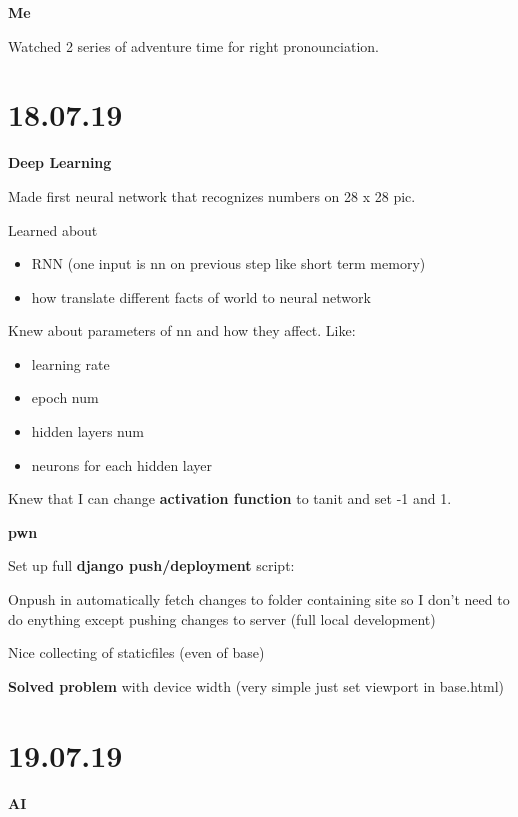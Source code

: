 \documentclass[12pt,a4paper,titlepage]{article}
\begin{document}
\begin{center}
    \large \textbf{Me}
\end{center}
Watched 2 series of adventure time for right pronounciation.

\newpage
\section{18.07.19}
\begin{center}
    \large \textbf{Deep Learning}
\end{center}

Made first neural network that recognizes numbers on 28 x 28 pic.

Learned about 
\begin{itemize}
    \item RNN (one input is nn on previous step like short term me\-mory)
    \item how translate different facts of world to neural network
\end{itemize} 

Knew about parameters of nn and how they affect. Like:
\begin{itemize}
    \item learning rate
    \item epoch num
    \item hidden layers num
    \item neurons for each hidden layer
\end{itemize}

Knew that I can change \textbf{activation function} to tanit and set -1 and 1.

\begin{center}
    \large \textbf{pwn}
\end{center}

Set up full \textbf{django push/deployment} script:

Onpush in automatically fetch changes to folder con\-ta\-ining si\-te so I don't ne\-ed to do enything except pushing changes to server (full local deve\-lop\-ment)

Nice collecting of staticfiles (even of base)

\textbf{Solved problem} with device width (very simple just set view\-port in base.html)

\newpage
\section{19.07.19}
\begin{center}
    \large \textbf{AI}
\end{center}
\end{document}
